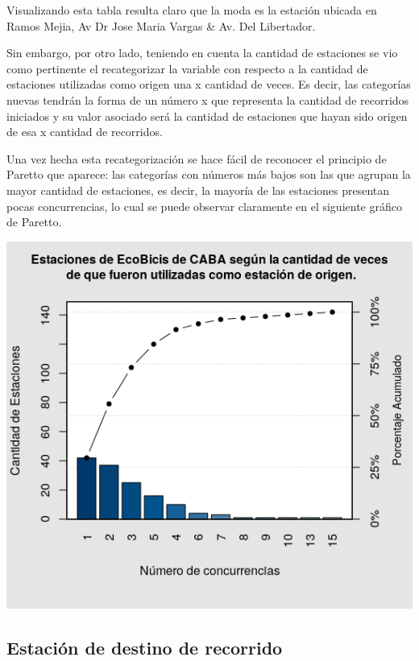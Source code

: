 \documentclass[11pt]{article}
\begin{document}
    Visualizando esta tabla resulta claro que la moda es la estaci\'on ubicada en Ramos Mejia, Av Dr Jose Maria Vargas \& Av. Del Libertador. 

    Sin embargo, por otro lado, teniendo en cuenta la cantidad de estaciones se vio como pertinente el recategorizar la variable 
    con respecto a la cantidad de estaciones utilizadas como origen una x cantidad de veces. Es decir, 
    las categor\'ias nuevas tendr\'an la forma de un n\'umero x que representa la cantidad de recorridos iniciados y su valor
    asociado ser\'a la cantidad de estaciones que hayan sido origen de esa x cantidad de recorridos. 

    Una vez hecha esta recategorizaci\'on se hace f\'acil de reconocer el principio de Paretto que aparece: las categor\'ias con n\'umeros m\'as bajos son las que 
    agrupan la mayor cantidad de estaciones, es decir, la mayor\'ia de las estaciones presentan pocas concurrencias, lo cual se puede observar claramente en el siguiente gr\'afico de Paretto. 

    \begin{center}
    \includegraphics[scale=0.7]{ParettoOrigen.png}
    \end{center}


    \subsection{Estaci\'on de destino de recorrido}
\end{document}
